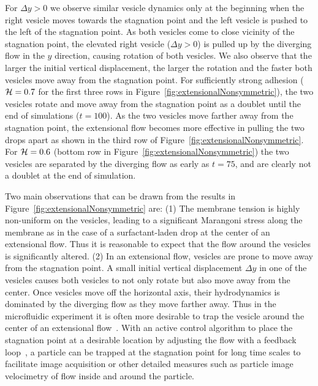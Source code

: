 \documentclass[prf,superscriptaddress,showkeys,longbibliography]{revtex4-1}
\begin{document}
For $\Delta y>0$ we observe similar vesicle dynamics only at the
beginning when the right vesicle moves towards the stagnation point and
the left vesicle is pushed to the left of the stagnation point.  As both
vesicles come to close vicinity of the stagnation point, the elevated
right vesicle ($\Delta y > 0$) is pulled up by the diverging flow in the
$y$ direction, causing rotation of both vesicles.  We also observe that
the larger the initial vertical displacement, the larger the rotation
and the faster both vesicles move away from the stagnation point. For
sufficiently strong adhesion (${\cal H}=0.7$ for the first three rows in
Figure~\ref{fig:extensionalNonsymmetric}), the two vesicles rotate and
move away from the stagnation point as a doublet until the end of
simulations ($t=100$).  As the two vesicles move farther away from the
stagnation point, the extensional flow becomes more effective in pulling
the two drops apart as shown in the third row of
Figure~\ref{fig:extensionalNonsymmetric}.  For ${\cal H}=0.6$ (bottom
row in Figure~\ref{fig:extensionalNonsymmetric})  the two vesicles are
separated by the diverging flow as early as $t=75$, and are clearly not
a doublet at the end of simulation.

Two main observations that can be drawn from the results in
Figure~\ref{fig:extensionalNonsymmetric} are: (1) The membrane tension is
highly non-uniform on the vesicles, leading to a significant Marangoni
stress along the membrane as in the case of a surfactant-laden drop at
the center of an extensional flow. Thus it is reasonable to expect that
the flow around the vesicles is significantly altered.  (2) In an
extensional flow, vesicles are prone to move away from the stagnation
point.  A small initial vertical displacement $\Delta y$ in one  of the
vesicles causes both vesicles to not only rotate but also move away from
the center. Once vesicles move off the horizontal axis, their
hydrodynamics is dominated by the diverging flow as they move farther
away.  Thus in the microfluidic experiment it is often more desirable to
trap the vesicle around the center of an extensional
flow~\cite{Spjut2010_MSThesis_Chapter3}. With an active control
algorithm to place the stagnation point at a desirable location by
adjusting the flow with a feedback
loop~\cite{BentleyLeal1986_JFMa,Johnson-Chavarria2011_EMJ}, a particle
can be trapped at the stagnation point for long time scales to
facilitate image acquisition or other detailed measures such as particle
image velocimetry of flow inside and around the particle.  
\end{document}
